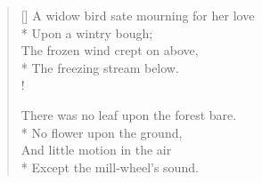 \documentclass[MAIN]{subfiles}
\begin{document}
\settowidth{\versewidth}{A widow bird sate mourning for her love}
\begin{verse}[\versewidth]
A widow bird sate mourning for her love\\*
\vin Upon a wintry bough;\\
The frozen wind crept on above,\\*
\vin The freezing stream below.\\!

There was no leaf upon the forest bare.\\*
\vin No flower upon the ground,\\
And little motion in the air\\*
\vin Except the mill-wheel's sound.
\end{verse}
\end{document}

